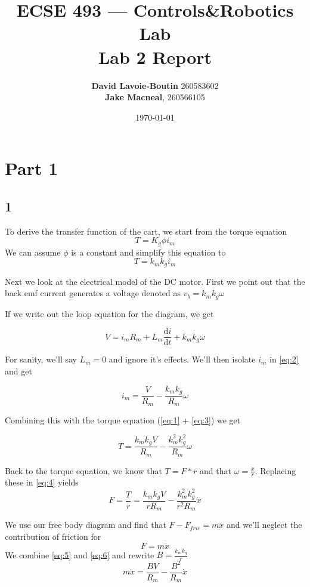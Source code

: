 \documentclass{article}
\title{ECSE 493 --- Controls\&Robotics Lab\\Lab 2 Report}
\author{\textbf{David Lavoie-Boutin} 260583602\\ \textbf{Jake Macneal}, 260566105}
\date{\today}
\begin{document}
\maketitle
\section*{Part 1}
\subsection*{1}
To derive the transfer function of the cart, we start from the torque equation $$T = K_g \phi i_m$$ We can assume $\phi$ is a constant and simplify this equation to
\begin{equation}
    T=k_m k_g i_m \label{eq:1}
\end{equation}

Next we look at the electrical model of the DC motor. First we point out that the back emf current generates a voltage denoted as $v_b=k_m k_g \omega $

If we write out the loop equation for the diagram, we get

\begin{equation}
    V = i_m R_m + L_m \frac{\mathrm{d}i}{\mathrm{d}t} + k_m k_g \omega \label{eq:2}
\end{equation}

For sanity, we'll say $L_m = 0$ and ignore it's effects. We'll then isolate $i_m$ in \ref{eq:2} and get

\begin{equation}
    i_m = \frac{V}{R_m} - \frac{k_m k_g}{R_m}\omega \label{eq:3}
\end{equation}

Combining this with the torque equation (\ref{eq:1} + \ref{eq:3}) we get

\begin{equation}
    T = \frac{k_m k_g V}{R_m} - \frac{k_m^2 k_g^2}{R_m}\omega \label{eq:4}
\end{equation}

Back to the torque equation, we know that $T = F*r$ and that $\omega = \frac{\dot{x}}{r}$. Replacing these in \ref{eq:4} yields
\begin{equation}
    F = \frac{T}{r} = \frac{k_m k_g V}{rR_m} - \frac{k_m^2 k_g^2}{r^2R_m}\dot{x} \label{eq:5}
\end{equation}

We use our free body diagram and find that $F - F_{fric} = m \ddot{x}$ and we'll neglect the contribution of friction for
\begin{equation}
    F = m \ddot{x} \label{eq:6}
\end{equation}
We combine \ref{eq:5} and \ref{eq:6} and rewrite $B = \frac{k_m k_g}{r}$
\begin{equation}
    m \ddot{x} = \frac{B V}{R_m} - \frac{B^2}{R_m}\dot{x}
\end{equation}
\end{document}
